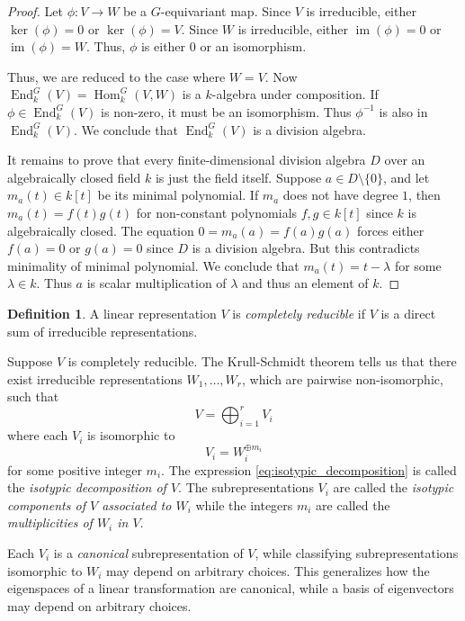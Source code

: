 \documentclass[12pt]{article}
\theoremstyle{plain}
\theoremstyle{definition}
\newtheorem{definition}[theorem]{Definition}
\theoremstyle{remark}
\numberwithin{equation}{section}
\begin{document}
\begin{proof}
Let $\phi : V \to W$ be a $G$-equivariant map.
Since $V$ is irreducible, either $\ker(\phi)=0$ or $\ker(\phi)=V$.
Since $W$ is irreducible, either $\operatorname{im}(\phi)=0$
or $\operatorname{im}(\phi)=W$.
Thus, $\phi$ is either $0$ or an isomorphism.

Thus, we are reduced to the case where $W=V$.
Now $\operatorname{End}^G_k(V)=\operatorname{Hom}_k^G(V,W)$
is a $k$-algebra under composition.
If $\phi \in \operatorname{End}^G_k(V)$ is non-zero, it must be an isomorphism.
Thus $\phi^{-1}$ is also in $\operatorname{End}^G_k(V)$.
We conclude that $\operatorname{End}^G_k(V)$ is a division algebra.

It remains to prove that every finite-dimensional division algebra $D$
over an algebraically closed field $k$ is just the field itself.
Suppose $a \in D \setminus \{0\} $,
and let $m_a(t) \in k[t]$ be its minimal polynomial.
If $m_a$ does not have degree $1$, then $m_a(t)=f(t)g(t)$
for non-constant polynomials $f,g \in k[t]$ since $k$ is algebraically
closed.
The equation $0=m_a(a)=f(a)g(a)$ forces either $f(a)=0$ or $g(a)=0$
since $D$ is a division algebra.  But this contradicts minimality of
minimal polynomial.  We conclude that $m_a(t)=t-\lambda$ for some
$\lambda \in k$.  Thus $a$ is scalar multiplication of $\lambda$
and thus an element of $k$.
\end{proof}

\begin{definition}
A linear representation $V$ is \emph{completely reducible}
if $V$ is a direct sum of irreducible representations.
\end{definition}

Suppose $V$ is completely reducible.
The Krull-Schmidt theorem tells us that there exist irreducible
representations $W_1, \ldots, W_r$, which are pairwise non-isomorphic,
such that
\begin{equation} \label{eq:isotypic_decomposition}
V = \bigoplus_{i=1}^r V_i
\end{equation}
where each $V_i$ is isomorphic to
\[
V_i = W_i^{\oplus m_i}
\]
for some positive integer $m_i$.
The expression \eqref{eq:isotypic_decomposition} is called the
\emph{isotypic decomposition of $V$}.
The subrepresentations $V_i$ are called the \emph{isotypic components of
$V$ associated to $W_i$} while the integers $m_i$ are called the
\emph{multiplicities of $W_i$ in $V$}.

Each $V_i$ is a \emph{canonical} subrepresentation of $V$,
while classifying subrepresentations isomorphic to $W_i$ may depend on
arbitrary choices.
This generalizes how the eigenspaces of a linear transformation
are canonical, while a basis of eigenvectors
may depend on arbitrary choices.
\end{document}
